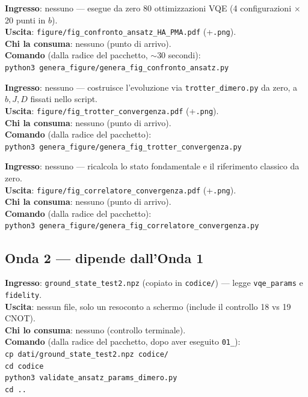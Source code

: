 \documentclass[11pt,a4paper]{article}
\newcommand{\code}[1]{\texttt{\small #1}}
\begin{document}
\begin{keyeq}[title={genera\_fig\_confronto\_ansatz.py}]
\textbf{Ingresso}: nessuno --- esegue da zero 80 ottimizzazioni VQE
(4 configurazioni $\times$ 20 punti in $b$).\\
\textbf{Uscita}: \code{figure/fig\_confronto\_ansatz\_HA\_PMA.pdf} (+\code{.png}).\\
\textbf{Chi la consuma}: nessuno (punto di arrivo).\\
\textbf{Comando} (dalla radice del pacchetto, $\sim$30 secondi):\\
\code{python3 genera\_figure/genera\_fig\_confronto\_ansatz.py}
\end{keyeq}

\begin{keyeq}[title={genera\_fig\_trotter\_convergenza.py}]
\textbf{Ingresso}: nessuno --- costruisce l'evoluzione via
\code{trotter\_dimero.py} da zero, a $b,J,D$ fissati nello script.\\
\textbf{Uscita}: \code{figure/fig\_trotter\_convergenza.pdf} (+\code{.png}).\\
\textbf{Chi la consuma}: nessuno (punto di arrivo).\\
\textbf{Comando} (dalla radice del pacchetto):\\
\code{python3 genera\_figure/genera\_fig\_trotter\_convergenza.py}
\end{keyeq}

\begin{keyeq}[title={genera\_fig\_correlatore\_convergenza.py}]
\textbf{Ingresso}: nessuno --- ricalcola lo stato fondamentale e il
riferimento classico da zero.\\
\textbf{Uscita}: \code{figure/fig\_correlatore\_convergenza.pdf} (+\code{.png}).\\
\textbf{Chi la consuma}: nessuno (punto di arrivo).\\
\textbf{Comando} (dalla radice del pacchetto):\\
\code{python3 genera\_figure/genera\_fig\_correlatore\_convergenza.py}
\end{keyeq}

\subsection{Onda 2 --- dipende dall'Onda 1}

\begin{keyeq}[title={validate\_ansatz\_params\_dimero.py}]
\textbf{Ingresso}: \code{ground\_state\_test2.npz} (copiato in
\code{codice/}) --- legge \code{vqe\_params} e \code{fidelity}.\\
\textbf{Uscita}: nessun file, solo un resoconto a schermo (include il
controllo 18 vs 19 CNOT).\\
\textbf{Chi lo consuma}: nessuno (controllo terminale).\\
\textbf{Comando} (dalla radice del pacchetto, dopo aver eseguito \code{01\_}):\\
\code{cp dati/ground\_state\_test2.npz codice/}\\
\code{cd codice}\\
\code{python3 validate\_ansatz\_params\_dimero.py}\\
\code{cd ..}
\end{keyeq}
\end{document}

